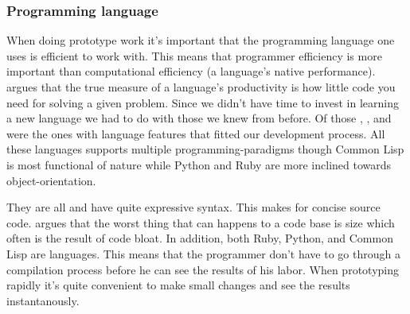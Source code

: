 \subsubsection{Programming language}
\label{section:selection.stack.server.language}

When doing prototype work it's important that the programming language one
uses is efficient to work with. This means that programmer efficiency is more
important than computational efficiency (a language's native performance).
\citet{mcanally08} argues that the true measure of a language's productivity
is how little code you need for solving a given problem.
Since we didn't have time to invest in learning a new language we had to do
with those we knew from before. Of those ,%
,%
and %
were the ones with language features that fitted our development process.
All these languages supports multiple programming-paradigms though Common
Lisp is most functional of nature  while Python and Ruby are more
inclined towards object-orientation.

They are all %
and have quite expressive syntax. This makes for concise source code.
\citet{yegge07} argues that the worst thing that can happens to a code base is
size which often is the result of code bloat. In addition, both Ruby, Python,
and Common Lisp are  languages.%
This means that the programmer don't have to go through a compilation process
before he can see the results of his labor. When prototyping rapidly it's
quite convenient to make small changes and see the results instantanously.

